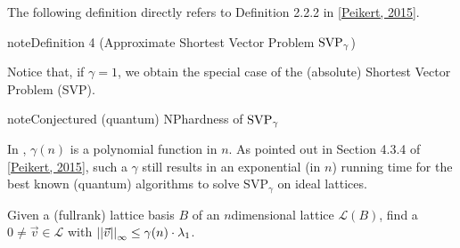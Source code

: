 \documentclass[letterpaper,10pt,english]{jupyterBook}
\begin{document}
\sphinxAtStartPar
The following definition directly refers to Definition 2.2.2 in {[}\hyperlink{cite.Thesis:id65}{Peikert, 2015}{]}.
\label{Thesis:approximate-shortest-vector-problem}
\begin{sphinxadmonition}{note}{Definition 4 (Approximate Shortest Vector Problem \protect\(\mathrm{SVP}_\gamma\protect\))}
\end{sphinxadmonition}

\sphinxAtStartPar
Notice that, if \(\gamma = 1\), we obtain the special case of the (absolute) Shortest Vector Problem (SVP).

\begin{sphinxadmonition}{note}{Conjectured (quantum) NP\sphinxhyphen{}hardness of \protect\(\mathrm{SVP}_\gamma\protect\)}

\sphinxAtStartPar
In {\hyperref[\detokenize{Thesis:RLWE-security}]{}}, \(\gamma(n)\) is a polynomial function in \(n\).
As pointed out in Section 4.3.4 of {[}\hyperlink{cite.Thesis:id65}{Peikert, 2015}{]}, such a \(\gamma\) still results in an exponential (in \(n\)) running time for the best known (quantum) algorithms to solve \(\mathrm{SVP}_\gamma\) on ideal lattices.
\end{sphinxadmonition}
\label{\detokenize{Thesis:remarks-on-security}}
\sphinxAtStartPar
Given a (full\sphinxhyphen{}rank) lattice basis \(B\) of an \(n\)\sphinxhyphen{}dimensional lattice \(\mathcal L(B)\), find a \(0 \neq \vec v \in \mathcal L\) with \(\left\lvert\left\lvert \vec v \right\rvert\right\rvert_\infty \le \gamma(n) \cdot \lambda_1\).

\begin{DUlineblock}{0em}
\item[] 
\end{DUlineblock}
\end{document}
